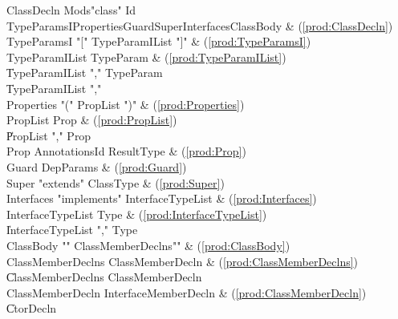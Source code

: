 \begin{bbgrammar}
          ClassDecln \: Mods\opt \xcd"class" Id TypeParamsI\opt Properties\opt Guard\opt Super\opt Interfaces\opt ClassBody & (\ref{prod:ClassDecln}) \\
         TypeParamsI \: \xcd"[" TypeParamIList \xcd"]" & (\ref{prod:TypeParamsI}) \\
      TypeParamIList \: TypeParam & (\ref{prod:TypeParamIList}) \\
                     \| TypeParamIList \xcd"," TypeParam \\
                     \| TypeParamIList \xcd"," \\
          Properties \: \xcd"(" PropList \xcd")" & (\ref{prod:Properties}) \\
            PropList \: Prop & (\ref{prod:PropList}) \\
                     \| PropList \xcd"," Prop \\
                Prop \: Annotations\opt Id ResultType & (\ref{prod:Prop}) \\
               Guard \: DepParams & (\ref{prod:Guard}) \\
               Super \: \xcd"extends" ClassType & (\ref{prod:Super}) \\
          Interfaces \: \xcd"implements" InterfaceTypeList & (\ref{prod:Interfaces}) \\
   InterfaceTypeList \: Type & (\ref{prod:InterfaceTypeList}) \\
                     \| InterfaceTypeList \xcd"," Type \\
           ClassBody \: \xcd"{" ClassMemberDeclns\opt \xcd"}" & (\ref{prod:ClassBody}) \\
   ClassMemberDeclns \: ClassMemberDecln & (\ref{prod:ClassMemberDeclns}) \\
                     \| ClassMemberDeclns ClassMemberDecln \\
    ClassMemberDecln \: InterfaceMemberDecln & (\ref{prod:ClassMemberDecln}) \\
                     \| CtorDecln \\
\end{bbgrammar}




